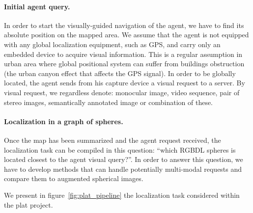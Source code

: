 \paragraph{Initial agent query.}
In order to start the visually-guided navigation of the agent, we have to find its absolute position on the mapped area. We assume that the agent is not equipped with any global localization equipment, such as GPS, and carry only an embedded device to acquire visual information. This is a regular assumption in urban area where global positional system can suffer from buildings obstruction (\eg the urban canyon effect that affects the GPS signal). In order to be globally located, the agent sends from his capture device a visual request to a server. By visual request, we regardless denote: monocular image, video sequence, pair of stereo images, semantically annotated image or combination of these.

\paragraph{Localization in a graph of spheres.}
Once the map has been summarized and the agent request received, the localization task can be compiled in this question: ``which RGBDL spheres is located closest to the agent visual query?''. In order to answer this question, we have to develop methods that can handle potentially multi-modal requests and compare them to augmented spherical images.



We present in figure~\ref{fig:plat_pipeline} the localization task considered within the \ac{plat} project.